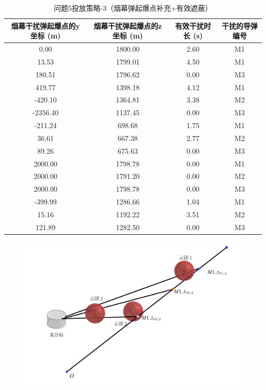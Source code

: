 \documentclass[../main.tex]{subfiles}
\begin{document}
\begin{table}[H]
\caption{问题5投放策略-3（烟幕弹起爆点补充+有效遮蔽）}
\label{tab:032} 
\centering
\begin{small}
\begin{tabular}{cccc}
\toprule[1.5pt]
烟幕干扰弹起爆点的y坐标 (m) & 烟幕干扰弹起爆点的z坐标 (m) & 有效干扰时长 (s) & 干扰的导弹编号 \\
\midrule[1pt]
0.00  & 1800.00 & 2.60 & M1 \\  %
13.53 & 1799.01 & 4.50 & M1 \\  %
180.51& 1796.62 & 0.00 & M3  \\  %
419.77& 1398.18 & 4.12 & M1 \\  %
-420.10&1364.81 & 3.38 & M2 \\  %
-2356.40&1137.45& 0.00 & M3  \\  %
-211.24& 698.68 & 1.75 & M1 \\  %
36.61  & 667.38 & 2.77 & M2 \\  %
89.26  & 675.63 & 0.00 & M3 \\  %
2000.00& 1798.78 & 0.00 & M1  \\  %
2000.00& 1791.20 & 0.00 & M2 \\  %
2000.00& 1798.78 & 0.00 & M3 \\  %
-399.99& 1286.66 & 1.04 & M1 \\  %
15.16  & 1192.22 & 3.51 & M2 \\  %
121.89 & 1282.50 & 0.00 & M3 \\  %
\bottomrule[1.5pt]
\end{tabular}
\end{small}
\end{table}



\begin{figure}[H]
\centering
\includegraphics[scale=0.5]{图三.png}
\caption{}
\label{图3}
\end{figure}
\end{document}
